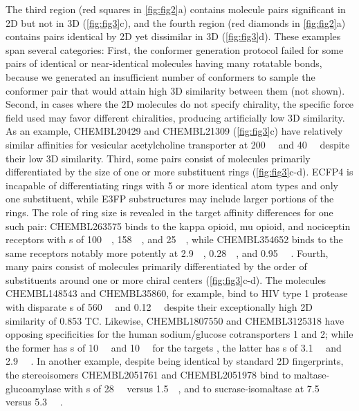 \documentclass[../../main.tex]{subfiles}
\begin{document}
\begin{refsection}
	The third region (red squares in \cref{fig:fig2}a) contains molecule pairs significant in 2D but not in 3D (\cref{fig:fig3}c), and the fourth region (red diamonds in \cref{fig:fig2}a) contains pairs identical by 2D yet dissimilar in 3D (\cref{fig:fig3}d).
	These examples span several categories: First, the conformer generation protocol failed for some pairs of identical or near-identical molecules having many rotatable bonds, because we generated an insufficient number of conformers to sample the conformer pair that would attain high 3D similarity between them (not shown).
	Second, in cases where the 2D molecules do not specify chirality, the specific force field used may favor different chiralities, producing artificially low 3D similarity.
	As an example, CHEMBL20429 and CHEMBL21309 (\cref{fig:fig3}c) have relatively similar affinities for vesicular acetylcholine transporter at \SI{200}{\nano\molar} and \SI{40}{\nano\molar} \supercite{rogers_1989} despite their low 3D similarity.
	Third, some pairs consist of molecules primarily differentiated by the size of one or more substituent rings (\cref{fig:fig3}c-d).
	ECFP4 is incapable of differentiating rings with 5 or more identical atom types and only one substituent, while E3FP substructures may include larger portions of the rings.
	The role of ring size is revealed in the target affinity differences for one such pair: CHEMBL263575 binds to the kappa opioid, mu opioid, and nociceptin receptors with \Ki s of \SI{100}{\nano\molar}, \SI{158}{\nano\molar}, and \SI{25}{\nano\molar}, while CHEMBL354652 binds to the same receptors notably more potently at \SI{2.9}{\nano\molar},  \SI{0.28}{\nano\molar}, and \SI{0.95}{\nano\molar} \supercite{rver_2000}.
	Fourth, many pairs consist of molecules primarily differentiated by the order of substituents around one or more chiral centers (\cref{fig:fig3}c-d).
	The molecules CHEMBL148543 and  CHEMBL35860, for example, bind to HIV type 1 protease with disparate  \Ki s of \SI{560}{\nano\molar} \supercite{kaltenbach_1998} and \SI{0.12}{\nano\molar} \supercite{lam_1996} despite their exceptionally high 2D similarity of 0.853 TC.
	Likewise, CHEMBL1807550 and CHEMBL3125318 have opposing specificities for the human sodium/glucose cotransporters 1 and 2; while the former has  \ICfifty s of \SI{10}{\nano\molar} and \SI{10}{\micro\molar} for the targets  \supercite{xu_2011}, the latter has \ICfifty s of \SI{3.1}{\micro\molar}  and \SI{2.9}{\nano\molar} \supercite{xu_2014}.
	In another example, despite being identical by standard 2D fingerprints, the stereoisomers CHEMBL2051761 and CHEMBL2051978 bind to maltase-glucoamylase with  \ICfifty s of \SI{28}{\nano\molar} versus \SI{1.5}{\micro\molar}, and to sucrase-isomaltase at \SI{7.5}{\nano\molar} versus \SI{5.3}{\micro\molar} \supercite{horii_1986}.

\end{refsection}
\end{document}
